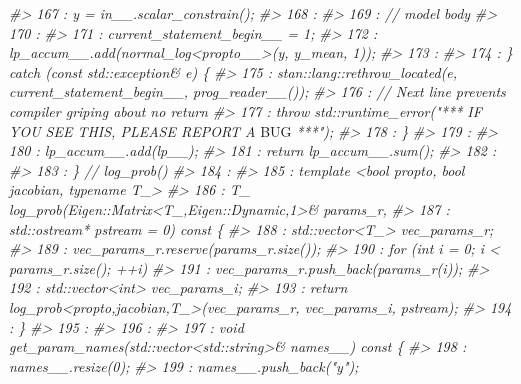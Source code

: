 \documentclass[
  10pt,
  italian,
  a4paper,
  extrafontsizes,onecolumn,openright
  ]{memoir}
\newenvironment{Shaded}{\begin{snugshade}}{\end{snugshade}}
\newcommand{\AlertTok}[1]{\textcolor[rgb]{0.94,0.16,0.16}{#1}}
\newcommand{\CommentTok}[1]{\textcolor[rgb]{0.56,0.35,0.01}{\textit{#1}}}
\begin{document}
\begin{Shaded}
\begin{Highlighting}[]
\CommentTok{\#\textgreater{}  167 :                 y = in\_\_.scalar\_constrain();}
\CommentTok{\#\textgreater{}  168 : }
\CommentTok{\#\textgreater{}  169 :             // model body}
\CommentTok{\#\textgreater{}  170 : }
\CommentTok{\#\textgreater{}  171 :             current\_statement\_begin\_\_ = 1;}
\CommentTok{\#\textgreater{}  172 :             lp\_accum\_\_.add(normal\_log\textless{}propto\_\_\textgreater{}(y, y\_mean, 1));}
\CommentTok{\#\textgreater{}  173 : }
\CommentTok{\#\textgreater{}  174 :         \} catch (const std::exception\& e) \{}
\CommentTok{\#\textgreater{}  175 :             stan::lang::rethrow\_located(e, current\_statement\_begin\_\_, prog\_reader\_\_());}
\CommentTok{\#\textgreater{}  176 :             // Next line prevents compiler griping about no return}
\CommentTok{\#\textgreater{}  177 :             throw std::runtime\_error("*** IF YOU SEE THIS, PLEASE REPORT A }\AlertTok{BUG}\CommentTok{ ***");}
\CommentTok{\#\textgreater{}  178 :         \}}
\CommentTok{\#\textgreater{}  179 : }
\CommentTok{\#\textgreater{}  180 :         lp\_accum\_\_.add(lp\_\_);}
\CommentTok{\#\textgreater{}  181 :         return lp\_accum\_\_.sum();}
\CommentTok{\#\textgreater{}  182 : }
\CommentTok{\#\textgreater{}  183 :     \} // log\_prob()}
\CommentTok{\#\textgreater{}  184 : }
\CommentTok{\#\textgreater{}  185 :     template \textless{}bool propto, bool jacobian, typename T\_\textgreater{}}
\CommentTok{\#\textgreater{}  186 :     T\_ log\_prob(Eigen::Matrix\textless{}T\_,Eigen::Dynamic,1\textgreater{}\& params\_r,}
\CommentTok{\#\textgreater{}  187 :                std::ostream* pstream = 0) const \{}
\CommentTok{\#\textgreater{}  188 :       std::vector\textless{}T\_\textgreater{} vec\_params\_r;}
\CommentTok{\#\textgreater{}  189 :       vec\_params\_r.reserve(params\_r.size());}
\CommentTok{\#\textgreater{}  190 :       for (int i = 0; i \textless{} params\_r.size(); ++i)}
\CommentTok{\#\textgreater{}  191 :         vec\_params\_r.push\_back(params\_r(i));}
\CommentTok{\#\textgreater{}  192 :       std::vector\textless{}int\textgreater{} vec\_params\_i;}
\CommentTok{\#\textgreater{}  193 :       return log\_prob\textless{}propto,jacobian,T\_\textgreater{}(vec\_params\_r, vec\_params\_i, pstream);}
\CommentTok{\#\textgreater{}  194 :     \}}
\CommentTok{\#\textgreater{}  195 : }
\CommentTok{\#\textgreater{}  196 : }
\CommentTok{\#\textgreater{}  197 :     void get\_param\_names(std::vector\textless{}std::string\textgreater{}\& names\_\_) const \{}
\CommentTok{\#\textgreater{}  198 :         names\_\_.resize(0);}
\CommentTok{\#\textgreater{}  199 :         names\_\_.push\_back("y");}

\end{Highlighting}
\end{Shaded}
\end{document}
